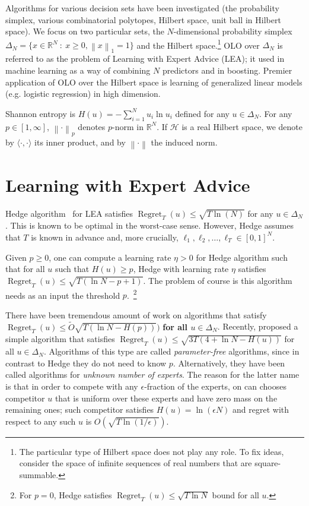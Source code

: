 \documentclass{colt2016} %
\DeclareMathOperator{\Regret}{Regret}
\newcommand{\R}{\mathbb{R}}     %
\renewcommand{\H}{\mathcal{H}}  %
\newcommand{\norm}[1]{\left\|{#1}\right\|}
\begin{document}
Algorithms for various decision sets have been investigated (the probability
simplex, various combinatorial polytopes, Hilbert space, unit ball in Hilbert
space). We focus on two particular sets, the $N$-dimensional probability
simplex $\Delta_N = \{ x \in \R^N ~:~ x \ge 0, \norm{x}_1 = 1\}$ and the
Hilbert space.\footnote{The particular type of Hilbert space does not play any
role. To fix ideas, consider the space of infinite sequences of real numbers
that are square-summable.} OLO over $\Delta_N$ is referred to as the problem of
Learning with Expert Advice (LEA); it used in machine learning as a way of
combining $N$ predictors and in boosting. Premier application of OLO over the
Hilbert space is learning of generalized linear models (e.g. logistic
regression) in high dimension.

Shannon entropy is $H(u) = -\sum_{i=1}^N u_i \ln u_i$ defined for any $u \in
\Delta_N$. For any $p \in [1,\infty]$, $\norm{\cdot}_p$ denotes $p$-norm in
$\R^N$. If $\H$ is a real Hilbert space, we denote by $\langle \cdot, \cdot
\rangle$ its inner product, and by $\norm{\cdot}$ the induced norm.

\section{Learning with Expert Advice}

Hedge algorithm~\citep{Freund-Schapire-1997} for LEA satisfies $\Regret_T(u)
\le \sqrt{T \ln(N)}$ for any $u \in \Delta_N$. This is known to be optimal in
the worst-case sense. However, Hedge assumes that $T$ is known in advance and,
more crucially, $\ell_1, \ell_2, \dots, \ell_T \in [0,1]^N$.

Given $p \ge 0$, one can compute a learning rate $\eta > 0$ for
Hedge algorithm such that for all $u$ such that $H(u) \ge p$, Hedge with
learning rate $\eta$ satisfies $\Regret_T(u) \le \sqrt{T (\ln N - p + 1)}$. The
problem of course is this algorithm needs as an input the threshold
$p$.~\footnote{For $p = 0$, Hedge satisfies  $\Regret_T(u) \le \sqrt{T \ln N}$
bound for all $u$.}

There have been tremendous amount of work \citep{Chaudhuri-Freund-Hsu-2009,
Chernov-Vovk-2010, Koolen-van-Erven-2015, Luo-Schapire-2015} on algorithms that
satisfy $\Regret_T(u) \le \widetilde O\sqrt{T (\ln N - H(p))})$ \textbf{for all
$u \in \Delta_N$}. Recently, \cite{Orabona-Pal-2016-parameter-free} proposed a
simple algorithm that satisfies $\Regret_T(u) \le \sqrt{3 T(4 + \ln N -
H(u))}$ for all $u \in \Delta_N$. Algorithms of this type are called
\emph{parameter-free} algorithms, since in contrast to Hedge they do not need
to know $p$. Alternatively, they have been called algorithms
for \emph{unknown number of experts}. The reason for the latter name is that in
order to compete with any $\epsilon$-fraction of the experts, on can chooses
competitor $u$ that is uniform over these experts and have zero mass on the
remaining ones; such competitor satisfies $H(u) = \ln (\epsilon N)$ and regret
with respect to any such $u$ is $O(\sqrt{T \ln(1/\epsilon)})$.
\end{document}
